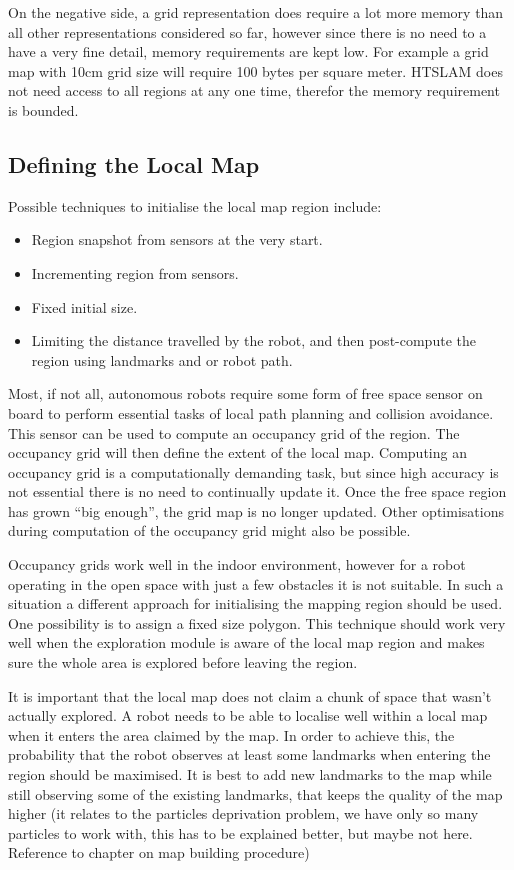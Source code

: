 On the negative side, a grid representation does require a lot more
memory than all other representations considered so far, however since
there is no need to a have a very fine detail, memory requirements are
kept low. For example a grid map with 10cm grid size will require 100
bytes per square meter. HTSLAM does not need access to all regions at
any one time, therefor the memory requirement is bounded.

\subsection{Defining the Local Map}

Possible techniques to initialise the local map region include:

\begin{itemize}
 \item Region snapshot from sensors at the very start.
 \item Incrementing region from sensors.
 \item Fixed initial size.
 \item Limiting the distance travelled by the robot, and then post-compute
 the region using landmarks and or robot path.
\end{itemize}

Most, if not all, autonomous robots require some form of free space
sensor on board to perform essential tasks of local path planning and
collision avoidance. This sensor can be used to compute an occupancy
grid of the region. The occupancy grid will then define the extent of
the local map. Computing an occupancy grid is a computationally
demanding task, but since high accuracy is not essential there is no
need to continually update it. Once the free space region has grown
``big enough'', the grid map is no longer updated.  Other
optimisations during computation of the occupancy grid might also
be possible.

Occupancy grids work well in the indoor environment, however for a
robot operating in the open space with just a few obstacles it is not
suitable. In such a situation a different approach for initialising
the mapping region should be used. One possibility is to assign a
fixed size polygon. This technique should work very well when the
exploration module is aware of the local map region and makes sure the
whole area is explored before leaving the region.

It is important that the local map does not claim a chunk of space
that wasn't actually explored. A robot needs to be able to localise
well within a local map when it enters the area claimed by the map. In
order to achieve this, the probability that the robot observes at
least some landmarks when entering the region should be maximised. It
is best to add new landmarks to the map while still observing some of
the existing landmarks, that keeps the quality of the map higher (it
relates to the particles deprivation problem, we have only so many
particles to work with, this has to be explained better, but maybe not
here. Reference to chapter on map building procedure)


